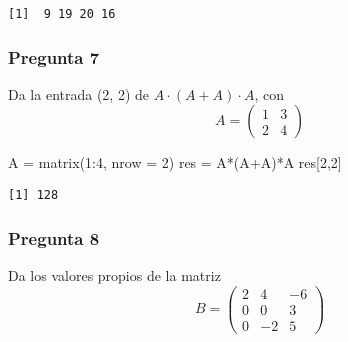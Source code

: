 \documentclass[
]{article}
\newenvironment{Shaded}{\begin{snugshade}}{\end{snugshade}}
\newcommand{\AttributeTok}[1]{\textcolor[rgb]{0.77,0.63,0.00}{#1}}
\newcommand{\ConstantTok}[1]{\textcolor[rgb]{0.00,0.00,0.00}{#1}}
\newcommand{\DecValTok}[1]{\textcolor[rgb]{0.00,0.00,0.81}{#1}}
\newcommand{\FunctionTok}[1]{\textcolor[rgb]{0.00,0.00,0.00}{#1}}
\newcommand{\NormalTok}[1]{#1}
\newcommand{\OtherTok}[1]{\textcolor[rgb]{0.56,0.35,0.01}{#1}}
\newcommand{\SpecialCharTok}[1]{\textcolor[rgb]{0.00,0.00,0.00}{#1}}
\begin{document}
\begin{verbatim}
[1]  9 19 20 16
\end{verbatim}

\hypertarget{pregunta-7}{%
\subsubsection{Pregunta 7}\label{pregunta-7}}

Da la entrada (2, 2) de \(A · (A + A) · A\), con
\[A = \begin{pmatrix} 1 & 3 \\ 2 & 4 \end{pmatrix}\]

\begin{Shaded}
\begin{Highlighting}[]
\NormalTok{A }\OtherTok{=} \FunctionTok{matrix}\NormalTok{(}\DecValTok{1}\SpecialCharTok{:}\DecValTok{4}\NormalTok{, }\AttributeTok{nrow =} \DecValTok{2}\NormalTok{)}
\NormalTok{res }\OtherTok{=}\NormalTok{ A}\SpecialCharTok{*}\NormalTok{(A}\SpecialCharTok{+}\NormalTok{A)}\SpecialCharTok{*}\NormalTok{A}
\NormalTok{res[}\DecValTok{2}\NormalTok{,}\DecValTok{2}\NormalTok{]}
\end{Highlighting}
\end{Shaded}

\begin{verbatim}
[1] 128
\end{verbatim}

\hypertarget{pregunta-8}{%
\subsubsection{Pregunta 8}\label{pregunta-8}}

Da los valores propios de la matriz
\[B = \begin{pmatrix} 2 & 4 & −6 \\0 & 0 & 3 \\0 & -2 & 5 \end{pmatrix} \]

\begin{Shaded}
\end{Shaded}
\end{document}
